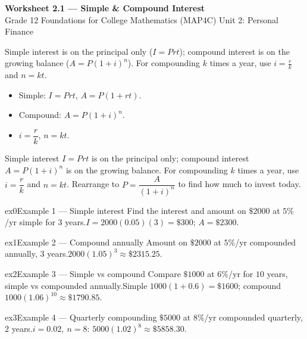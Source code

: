 \documentclass[11pt]{article}
\begin{document}
\begin{center}
{\LARGE\bfseries\color{titleblue}Worksheet 2.1 --- Simple \& Compound Interest}\\[2pt]
{\small Grade 12 Foundations for College Mathematics (MAP4C) \textperiodcentered{} Unit 2: Personal Finance}
\end{center}

\begin{ideabox}
Simple interest is on the principal only ($I=Prt$); compound interest is on the growing balance ($A=P(1+i)^{n}$). For compounding $k$ times a year, use $i=\tfrac{r}{k}$ and $n=kt$.
\begin{itemize}[leftmargin=*,itemsep=2pt]
  \item Simple: $I=Prt$, $A=P(1+rt)$.
  \item Compound: $A=P(1+i)^{n}$.
  \item $i=\dfrac{r}{k}$, $n=kt$.
\end{itemize}
\end{ideabox}

\begin{learnbox}
Simple interest $I=Prt$ is on the principal only; compound interest $A=P(1+i)^{n}$ is on the growing balance.
For compounding $k$ times a year, use $i=\dfrac{r}{k}$ and $n=kt$.
Rearrange to $P=\dfrac{A}{(1+i)^{n}}$ to find how much to invest today.
\end{learnbox}


\begin{example}{ex0}{Example 1 --- Simple interest}
Find the interest and amount on $\$2000$ at $5\%$/yr simple for $3$ years.\soln $I=2000(0.05)(3)=\$300$; $A=\$2300$.
\end{example}

\begin{example}{ex1}{Example 2 --- Compound annually}
Amount on $\$2000$ at $5\%$/yr compounded annually, $3$ years.\soln $2000(1.05)^{3}\approx\$2315.25$.
\end{example}

\begin{example}{ex2}{Example 3 --- Simple vs compound}
Compare $\$1000$ at $6\%$/yr for $10$ years, simple vs compounded annually.\soln Simple $1000(1+0.6)=\$1600$; compound $1000(1.06)^{10}\approx\$1790.85$.
\end{example}

\begin{example}{ex3}{Example 4 --- Quarterly compounding}
$\$5000$ at $8\%$/yr compounded quarterly, $2$ years.\soln $i=0.02,\ n=8$: $5000(1.02)^{8}\approx\$5858.30$.
\end{example}
\end{document}
